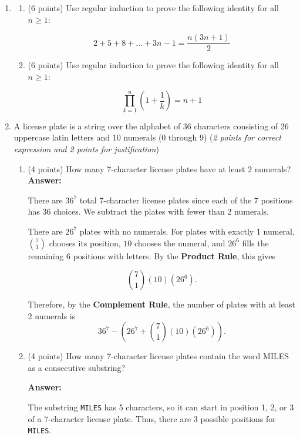 \documentclass[10pt,letterpaper,unboxed,cm]{article}
\begin{document}
\begin{enumerate}

\item
\begin{enumerate}
\item (6 points)
Use regular induction to prove the following identity for all $n\geq 1$:

$$2+5+8+\dots + 3n-1 = \frac{n(3n+1)}{2}$$

\item (6 points)
Use regular induction to prove the following identity for all $n\geq 1$:

$$\prod_{k=1}^n (1 + \frac{1}{k}) = n+1$$
\end{enumerate}


\item
A license plate is a string over the alphabet of 36 characters consisting of 26 uppercase latin letters and 10 numerals (0 through 9) (\emph{2 points for correct expression and 2 points for justification})

\begin{enumerate}


\item
(4 points)
How many 7-character license plates have at least 2 numerals? \\

\textbf{Answer:}

There are $36^7$ total 7-character license plates since each of the
7 positions has 36 choices. We subtract the plates with fewer than
2 numerals.

There are $26^7$ plates with no numerals. For plates with exactly
1 numeral, $\binom{7}{1}$ chooses its position, $10$ chooses the
numeral, and $26^6$ fills the remaining 6 positions with letters.
By the \textbf{Product Rule}, this gives

\[
\binom{7}{1}(10)(26^6).
\]

Therefore, by the \textbf{Complement Rule}, the number of plates with
at least 2 numerals is
\[
\boxed{36^7-\left(26^7+\binom{7}{1}(10)(26^6)\right)}.
\]

\item
(4 points)
How many 7-character license plates contain the word MILES as a consecutive substring?

\textbf{Answer:}


The substring \texttt{MILES} has 5 characters, so it can start in
position 1, 2, or 3 of a 7-character license plate. Thus, there are
3 possible positions for \texttt{MILES}.


\end{enumerate}
\end{enumerate}
\end{document}
